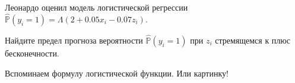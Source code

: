 
\begin{question}
Леонардо оценил модель логистической регрессии \(\hat{\mathbb{P}}(y_i = 1) = \Lambda(2 + 0.05 x_i - 0.07 z_i)\).

Найдите предел прогноза вероятности \(\hat{\mathbb{P}}(y_i = 1)\) при \(z_i\) стремящемся к плюс бесконечности.
\end{question}

\begin{solution}
Вспоминаем формулу логистической функции. Или картинку!
\end{solution}

